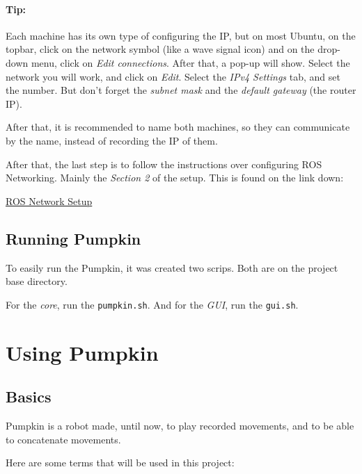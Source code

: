 \documentclass[oneside,a4paper,titlepage]{article}
\begin{document}
\paragraph{Tip: }Each machine has its own type of configuring the IP, but on most Ubuntu, on the topbar, click on the network symbol (like a wave signal icon) and on the drop-down menu, click on \emph{Edit connections}. After that, a pop-up will show. Select the network you will work, and click on \emph{Edit}. Select the \emph{IPv4 Settings} tab, and set the number. But don't forget the \emph{subnet mask} and the \emph{default gateway} (the router IP).

After that, it is recommended to name both machines, so they can communicate by the name, instead of recording the IP of them.

After that, the last step is to follow the instructions over configuring ROS Networking. Mainly the \emph{Section 2} of the setup. This is found on the link down:

\begin{center}
\href{http://wiki.ros.org/ROS/NetworkSetup}{ROS Network Setup}
\end{center}

\subsection{Running Pumpkin}
\label{sec:run}
To easily run the Pumpkin, it was created two scrips. Both are on the project base directory.

For the \emph{core}, run the \texttt{pumpkin.sh}. And for the \emph{GUI}, run the \texttt{gui.sh}.

\newpage
\section{Using Pumpkin}

\subsection{Basics}

Pumpkin is a robot made, until now, to play recorded movements, and to be able to concatenate movements.

Here are some terms that will be used in this project:
\end{document}
